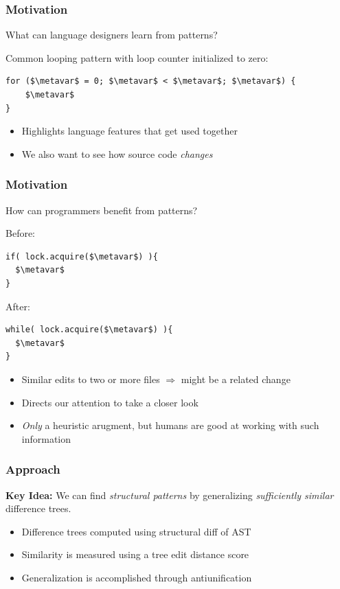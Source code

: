 \documentclass[ignorenonframetext,]{beamer}
\newcommand{\metavar}{$\square$}
\begin{document}
\begin{frame}[fragile]\frametitle{Motivation}

What can language designers learn from patterns?

Common looping pattern with loop counter initialized to zero:

\begin{lstlisting}
for ($\metavar$ = 0; $\metavar$ < $\metavar$; $\metavar$) {
    $\metavar$
}
\end{lstlisting}

\begin{itemize}
\item
  Highlights language features that get used together
\item
  We also want to see how source code \emph{changes}
\end{itemize}

\end{frame}

\begin{frame}[fragile]\frametitle{Motivation}

How can programmers benefit from patterns?

Before:

\begin{lstlisting}
if( lock.acquire($\metavar$) ){
  $\metavar$
}
\end{lstlisting}

After:

\begin{lstlisting}
while( lock.acquire($\metavar$) ){
  $\metavar$
}
\end{lstlisting}

\begin{itemize}
\item
  Similar edits to two or more files $\Rightarrow$ might be a related
  change
\item
  Directs our attention to take a closer look
\item
  \emph{Only} a heuristic arugment, but humans are good at working with
  such information
\end{itemize}

\end{frame}

\begin{frame}\frametitle{Approach}

\textbf{Key Idea:} We can find \emph{structural patterns} by
generalizing \emph{sufficiently similar} difference trees.

\begin{itemize}
\item
  Difference trees computed using structural diff of AST
\item
  Similarity is measured using a tree edit distance score
\item
  Generalization is accomplished through antiunification
\end{itemize}

\end{frame}
\end{document}
